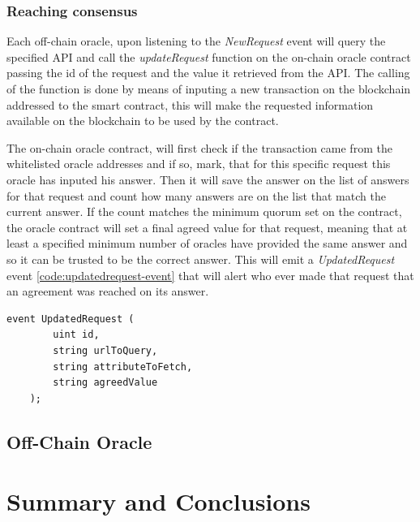 \subsubsection{Reaching consensus}

Each off-chain oracle, upon listening to the \textit{NewRequest} event will query the specified API and call the \textit{updateRequest} function on the on-chain oracle contract passing the id of the request and the value it retrieved from the API. The calling of the function is done by means of inputing a new transaction on the blockchain addressed to the smart contract, this will make the requested information available on the blockchain to be used by the contract.

The on-chain oracle contract, will first check if the transaction came from the whitelisted oracle addresses and if so, mark, that for this specific request this oracle has inputed his answer. Then it will save the answer on the list of answers for that request and count how many answers are on the list that match the current answer. If the count matches the minimum quorum set on the contract, the oracle contract will set a final agreed value for that request, meaning that at least a specified minimum number of oracles have provided the same answer and so it can be trusted to be the correct answer. This will emit a \textit{UpdatedRequest} event \ref{code:updatedrequest-event} that will alert who ever made that request that an agreement was reached on its answer.


\begin{lstlisting}[language=Solidity, label=code:updatedrequest-event]
    event UpdatedRequest (
        uint id,
        string urlToQuery,
        string attributeToFetch,
        string agreedValue
    );
\end{lstlisting}


\subsection{Off-Chain Oracle}


\section{Summary and Conclusions}
